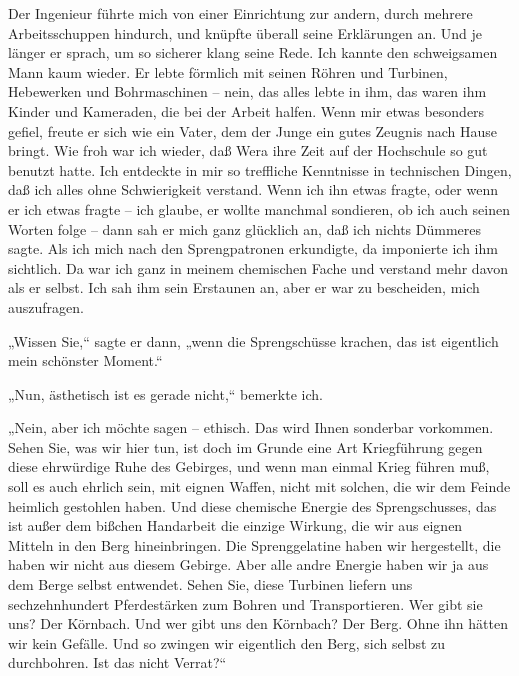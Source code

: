 
Der Ingenieur führte mich von einer Einrichtung zur andern, durch
mehrere Arbeitsschuppen hindurch, und knüpfte überall seine
Erklärungen an. Und je länger er sprach, um so sicherer klang seine
Rede. Ich kannte den schweigsamen Mann kaum wieder. Er lebte
förmlich mit seinen Röhren und Turbinen, Hebewerken und
Bohrmaschinen – nein, das alles lebte in ihm, das waren ihm Kinder
und Kameraden, die bei der Arbeit halfen. Wenn mir etwas besonders
gefiel, freute er sich wie ein Vater, dem der Junge ein gutes
Zeugnis nach Hause bringt. Wie froh war ich wieder, daß Wera ihre
Zeit auf der Hochschule so gut benutzt hatte. Ich entdeckte in mir
so treffliche Kenntnisse in technischen Dingen, daß ich alles ohne
Schwierigkeit verstand. Wenn ich ihn etwas fragte, oder wenn er ich
etwas fragte – ich glaube, er wollte manchmal sondieren, ob ich
auch seinen Worten folge – dann sah er mich ganz glücklich an, daß
ich nichts Dümmeres sagte. Als ich mich nach den Sprengpatronen
erkundigte, da imponierte ich ihm sichtlich. Da war ich ganz in
meinem chemischen Fache und verstand mehr davon als er selbst. Ich
sah ihm sein Erstaunen an, aber er war zu bescheiden, mich
auszufragen.

„Wissen Sie,“ sagte er dann, „wenn die Sprengschüsse krachen, das
ist eigentlich mein schönster Moment.“

„Nun, ästhetisch ist es gerade nicht,“ bemerkte ich.

„Nein, aber ich möchte sagen – ethisch. Das wird Ihnen sonderbar
vorkommen. Sehen Sie, was wir hier tun, ist doch im Grunde eine Art
Kriegführung gegen diese ehrwürdige Ruhe des Gebirges, und wenn man
einmal Krieg führen muß, soll es auch ehrlich sein, mit eignen
Waffen, nicht mit solchen, die wir dem Feinde heimlich gestohlen
haben. Und diese chemische Energie des Sprengschusses, das ist
außer dem bißchen Handarbeit die einzige Wirkung, die wir aus
eignen Mitteln in den Berg hineinbringen. Die Sprenggelatine haben
wir hergestellt, die haben wir nicht aus diesem Gebirge. Aber alle
andre Energie haben wir ja aus dem Berge selbst entwendet. Sehen
Sie, diese Turbinen liefern uns sechzehnhundert Pferdestärken zum
Bohren und Transportieren. Wer gibt sie uns? Der Körnbach. Und wer
gibt uns den Körnbach? Der Berg. Ohne ihn hätten wir kein Gefälle.
Und so zwingen wir eigentlich den Berg, sich selbst zu durchbohren.
Ist das nicht Verrat?“

